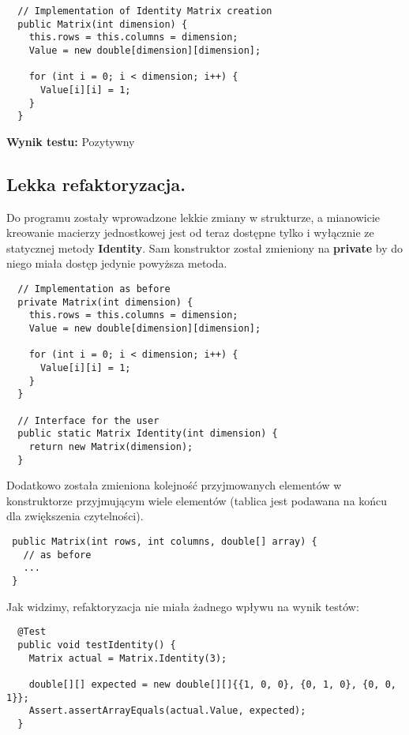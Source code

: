 \documentclass[a4paper,12pt,twoside]{article}
\begin{document}
\begin{lstlisting}
  // Implementation of Identity Matrix creation
  public Matrix(int dimension) {
    this.rows = this.columns = dimension;
    Value = new double[dimension][dimension];

    for (int i = 0; i < dimension; i++) {
      Value[i][i] = 1;
    }
  }
\end{lstlisting}
\medskip

\noindent
\textbf{Wynik testu: }{\color{green} Pozytywny}


\subsection{Lekka refaktoryzacja.}
\bigskip


Do programu zostały wprowadzone lekkie zmiany w strukturze, a mianowicie kreowanie macierzy
jednostkowej jest od teraz dostępne tylko i wyłącznie ze statycznej metody \textbf{Identity}.
Sam konstruktor został zmieniony na \textbf{private} by do niego miała dostęp jedynie
powyższa metoda.\\

\begin{lstlisting}
  // Implementation as before
  private Matrix(int dimension) {
    this.rows = this.columns = dimension;
    Value = new double[dimension][dimension];

    for (int i = 0; i < dimension; i++) {
      Value[i][i] = 1;
    }
  }

  // Interface for the user
  public static Matrix Identity(int dimension) {
    return new Matrix(dimension);
  }
\end{lstlisting}
\medskip

\noindent
Dodatkowo została zmieniona kolejność przyjmowanych elementów w konstruktorze przyjmującym
wiele elementów (tablica jest podawana na końcu dla zwiększenia czytelności).

\begin{lstlisting}
 public Matrix(int rows, int columns, double[] array) {
   // as before
   ...
 }
\end{lstlisting}
\medskip

\noindent
Jak widzimy, refaktoryzacja nie miała żadnego wpływu na wynik testów:\\

\begin{lstlisting}
  @Test
  public void testIdentity() {
    Matrix actual = Matrix.Identity(3);

    double[][] expected = new double[][]{{1, 0, 0}, {0, 1, 0}, {0, 0, 1}};
    Assert.assertArrayEquals(actual.Value, expected);
  }
\end{lstlisting}
\medskip
\end{document}
